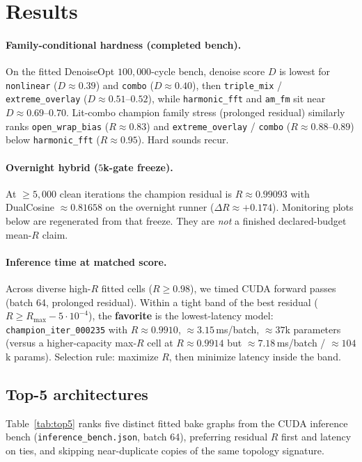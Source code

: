 \section{Results}
\label{sec:results}

\paragraph{Family-conditional hardness (completed bench).}
On the fitted DenoiseOpt $100{,}000$-cycle bench, denoise score $D$ is lowest for \texttt{nonlinear} ($D\approx 0.39$) and \texttt{combo} ($D\approx 0.40$), then \texttt{triple\_mix} / \texttt{extreme\_overlay} ($D\approx 0.51$--$0.52$), while \texttt{harmonic\_fft} and \texttt{am\_fm} sit near $D\approx 0.69$--$0.70$.
Lit-combo champion family stress (prolonged residual) similarly ranks \texttt{open\_wrap\_bias} ($R\approx 0.83$) and \texttt{extreme\_overlay} / \texttt{combo} ($R\approx 0.88$--$0.89$) below \texttt{harmonic\_fft} ($R\approx 0.95$).
Hard sounds recur.

\paragraph{Overnight hybrid ($5$k-gate freeze).}
At $\ge 5{,}000$ clean iterations the champion residual is $R\approx 0.99093$ with DualCosine $\approx 0.81658$ on the overnight runner ($\Delta R\approx{+}0.174$).
Monitoring plots below are regenerated from that freeze.
They are \emph{not} a finished declared-budget mean-$R$ claim.

\paragraph{Inference time at matched score.}
Across diverse high-$R$ fitted cells ($R\ge 0.98$), we timed CUDA forward passes (batch 64, prolonged residual).
Within a tight band of the best residual ($R \ge R_{\max}-5\cdot10^{-4}$), the \textbf{favorite} is the lowest-latency model:
\texttt{champion\_iter\_000235} with $R\approx 0.9910$, $\approx 3.15$\,ms/batch, $\approx 37$k parameters
(versus a higher-capacity max-$R$ cell at $R\approx 0.9914$ but $\approx 7.18$\,ms/batch / $\approx 104$k params).
Selection rule: maximize $R$, then minimize latency inside the band.

\subsection{Top-5 architectures}
\label{sec:top5-arch}
Table~\ref{tab:top5} ranks five distinct fitted bake graphs from the CUDA inference bench
(\texttt{inference\_bench.json}, batch 64), preferring residual $R$ first and latency on ties,
and skipping near-duplicate copies of the same topology signature.

